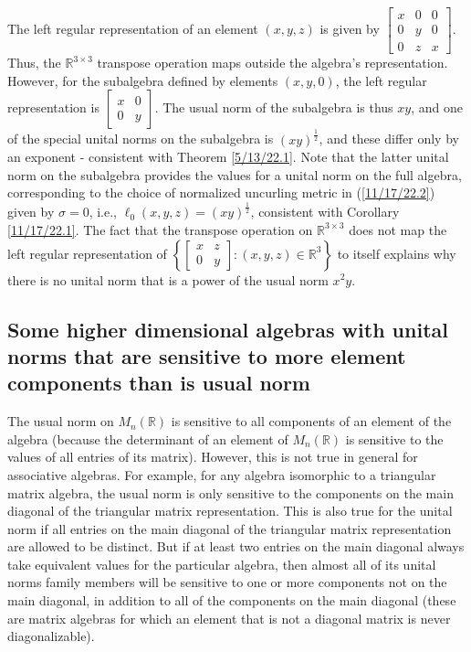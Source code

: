 \documentclass{amsart}
\numberwithin{equation}{section}
\theoremstyle{definition}
\numberwithin{theorem}{section}
\begin{document}
The left regular representation of an element $(x,y,z)$ is given by $\left[\begin{array}{ccc}
x & 0 & 0   \\
 0 & y & 0 \\ 0 & z & x    
\end{array} \right]$.  Thus, the $\mathbb{R}^{3\times 3}$ transpose operation maps outside the algebra's representation.  However, for the subalgebra defined by elements $(x,y,0)$, the left regular representation is 
 $\left[\begin{array}{ccc}
x & 0  \\
 0 & y  
\end{array} \right]$.  The usual norm of the subalgebra is thus $xy$, and one of the special unital norms on the subalgebra is $(xy)^{\frac{1}{2}}$, and these differ only by an exponent - consistent with Theorem \ref{5/13/22.1}.   Note that the latter unital norm on the subalgebra provides the values for a unital norm on the full algebra, corresponding to the choice of normalized uncurling metric in (\ref{11/17/22.2}) given by $\sigma = 0$, i.e., $\ell_0(x,y,z) = (xy)^{\frac{1}{2}}$, consistent with Corollary \ref{11/17/22.1}.  The fact that the transpose operation on $\mathbb{R}^{3\times 3}$ does not map the left regular representation of $\left\{\left[\begin{array}{ccc}
x & z  \\
 0 & y  
\end{array} \right]:(x,y,z)\in \mathbb{R}^3\right\}$ to itself explains why there is no unital norm that is a power of the usual norm $x^2y$.
  
\subsection{Some higher dimensional algebras with unital norms that are sensitive to more element components than is  usual norm}

The usual norm on $ M_n(\mathbb{R})$ is sensitive to all components of an element of the algebra (because the determinant of an element of $ M_n(\mathbb{R})$  is sensitive to the values of all entries of its matrix).    However, this is not true in general for associative algebras.  For example, for any algebra isomorphic to a triangular matrix algebra, the usual norm is only sensitive to the components on the main diagonal of the triangular matrix representation.  This is also true for the unital norm if all entries on the main diagonal of the triangular matrix representation are allowed to be distinct.  But if  at least two entries on the main diagonal always take equivalent values for the particular algebra,  then almost all of its unital norms family members will be sensitive to one or more components not on the main diagonal, in addition to all of the components on the main diagonal (these are matrix algebras for which an element that is not a diagonal matrix is never diagonalizable).  
\end{document}
